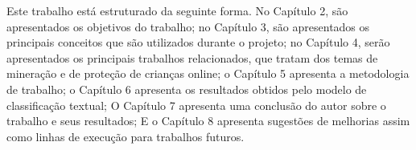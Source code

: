 


Este trabalho está estruturado da seguinte forma. No Capítulo 2, são apresentados os objetivos do trabalho; no Capítulo 3, são apresentados os principais conceitos que são utilizados durante o projeto; no Capítulo 4, serão apresentados os principais trabalhos relacionados, que tratam dos temas de mineração e de proteção de crianças online; o Capítulo 5 apresenta a metodologia de trabalho; o Capítulo 6 apresenta os resultados obtidos pelo modelo de classificação textual; O Capítulo 7 apresenta uma conclusão do autor sobre o trabalho e seus resultados; E o Capítulo 8 apresenta sugestões de melhorias assim como linhas de execução para trabalhos futuros.


